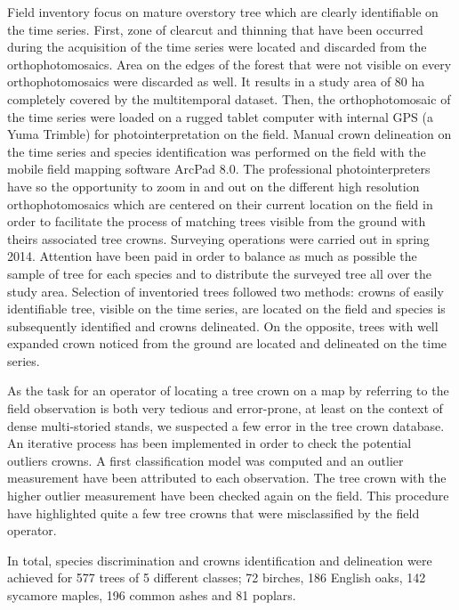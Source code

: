 \documentclass[remotesensing,article,submit,moreauthors,pdftex,12pt,a4paper]{mdpi} %
\begin{document}
Field inventory focus on mature overstory tree which are clearly identifiable on the time series. 
First, zone of clearcut and thinning that have been occurred during the acquisition of the time series were located and discarded from the orthophotomosaics. 
Area on the edges of the forest that were not visible on every orthophotomosaics were discarded as well. 
It results in a study area of 80 ha completely covered by the multitemporal dataset. 
Then, the orthophotomosaic of the time series were loaded on a rugged tablet computer with internal GPS (a Yuma Trimble\textsuperscript{\textregistered}) for photointerpretation on the field. 
Manual crown delineation on the time series and species identification was performed on the field with the mobile field mapping software ArcPad 8.0. 
The professional photointerpreters have so the opportunity to zoom in and out on the different high resolution orthophotomosaics which are centered on their current location on the field in order to facilitate the process of matching trees visible from the ground with theirs associated tree crowns. 
Surveying operations were carried out in spring 2014. 
Attention have been paid in order to balance as much as possible the sample of tree for each species and to distribute the surveyed tree all over the study area. 
Selection of inventoried trees followed two methods: crowns of easily identifiable tree, visible on the time series, are located on the field and species is subsequently identified and crowns delineated. 
On the opposite, trees with well expanded crown noticed from the ground are located and delineated on the time series. 

As the task for an operator of locating a tree crown on a map by referring to the field observation is both very tedious and error-prone, at least on the context of dense multi-storied stands, we suspected a few error in the tree crown database. 
An iterative process has been implemented in order to check the potential outliers crowns. 
A first classification model was computed and an outlier measurement have been attributed to each observation. 
The tree crown with the higher outlier measurement have been checked again on the field. This procedure have highlighted quite a few tree crowns that were misclassified by the field operator.

In total, species discrimination and crowns identification and delineation were achieved for 577 trees of 5 different classes; 72 birches, 186 English oaks, 142 sycamore maples, 196 common ashes and 81 poplars.
\end{document}
